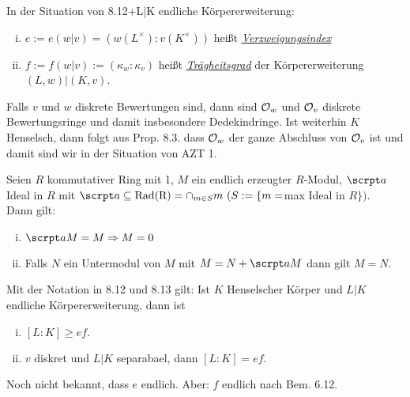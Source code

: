 \begin{defi}
In der Situation von 8.12+L|K endliche Körpererweiterung:
\begin{enumerate}[i)]
\item $e:=e(w|v)=(w(L^\times):v(K^\times))$ heißt \underline{\emph{Verzweigungsindex}}
\item $f:=f(w|v):=(\kappa_w:\kappa_v)$ heißt \underline{\emph{Trägheitsgrad}} der Körpererweiterung $(L,w)|(K,v)$.
\end{enumerate}
\end{defi}

\begin{Bem}
Falls $v$ und $w$ diskrete Bewertungen sind, dann sind $\mathcal{O}_w$ und $\mathcal{O}_v$ diskrete Bewertungsringe und damit insbesondere Dedekindringe. Ist weiterhin $K$ Henselsch, dann folgt aus Prop. 8.3. dass $\mathcal{O}_w$ der ganze Abschluss von $\mathcal{O}_v$ ist und damit sind wir in der Situation von AZT 1.
\end{Bem}

\begin{Fakt}
Seien $R$ kommutativer Ring mit 1, $M$ ein endlich erzeugter $R$-Modul, $\a$ Ideal in $R$ mit $\a \subseteq \mathrm{Rad(R)}=\cap_{m \in S} m \ (S:=\{m =  $max Ideal in $ R\})$.\\
Dann gilt:
\begin{enumerate}[i)]
\item $\a M=M \Rightarrow M=0$
\item Falls $N$ ein Untermodul von $M$ mit $M=N+\a M$ dann gilt $M=N$.
\end{enumerate}
\end{Fakt}

\begin{Prop}
Mit der Notation in 8.12 und 8.13 gilt: Ist $K$ Henselscher Körper und $L|K$ endliche Körpererweiterung, dann ist
\begin{enumerate}[i)]
\item $[L:K] \geq ef.$
\item $v$ diskret und $L|K$ separabael, dann $[L:K]=ef$.
\end{enumerate}
\danger Noch nicht bekannt, dass $e$ endlich. Aber: $f$ endlich nach Bem. 6.12.
\end{Prop}

